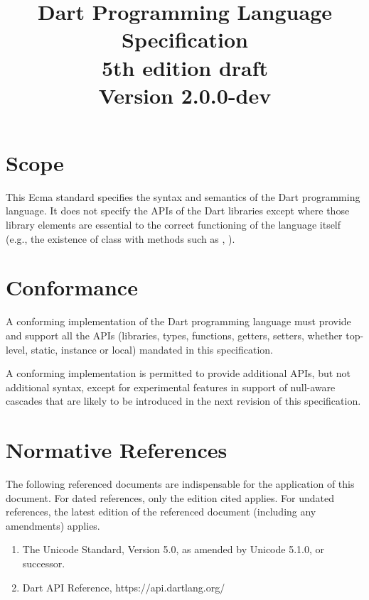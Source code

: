 \documentclass{article}
\title{Dart Programming Language Specification\\
{5th edition draft}\\
{\large Version 2.0.0-dev}}
\begin{document}
\maketitle
\tableofcontents

\newpage

\pagestyle{myheadings}


\section{Scope}

\LMHash{}
This Ecma standard specifies the syntax and semantics of the Dart programming language.
It does not specify the APIs of the Dart libraries except where those library elements are essential to the correct functioning of the language itself (e.g., the existence of class  with methods such as , ).


\section{Conformance}

\LMHash{}
A conforming implementation of the Dart programming language must provide and support all the APIs (libraries, types, functions, getters, setters, whether top-level, static, instance or local) mandated in this specification.

\LMHash{}
A conforming implementation is permitted to provide additional APIs, but not additional syntax, except for experimental features in support of null-aware cascades that are likely to be introduced in the next revision of this specification.


\section{Normative References}

\LMHash{}
The following referenced documents are indispensable for the application of this document.
For dated references, only the edition cited applies.
For undated references, the latest edition of the referenced document (including any amendments) applies.

\begin{enumerate}
\item
  The Unicode Standard, Version 5.0, as amended by Unicode 5.1.0, or successor.
\item
  Dart API Reference, https://api.dartlang.org/
\end{enumerate}
\end{document}
